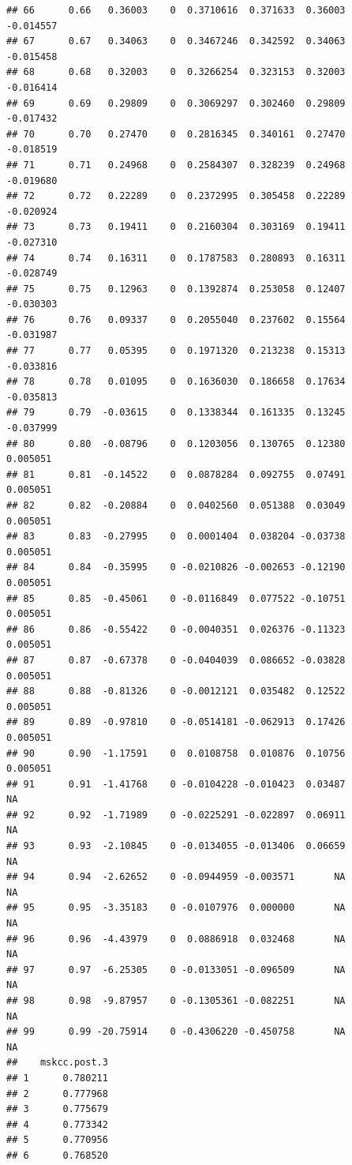 \documentclass{article}\usepackage[]{graphicx}\usepackage[]{color}
\makeatletter
\newenvironment{kframe}{%
 \def\at@end@of@kframe{}%
 \ifinner\ifhmode%
  \def\at@end@of@kframe{\end{minipage}}%
  \begin{minipage}{\columnwidth}%
 \fi\fi%
 \def\FrameCommand##1{\hskip\@totalleftmargin \hskip-\fboxsep
 \colorbox{shadecolor}{##1}\hskip-\fboxsep
     \hskip-\linewidth \hskip-\@totalleftmargin \hskip\columnwidth}%
 \MakeFramed {\advance\hsize-\width
   \@totalleftmargin\z@ \linewidth\hsize
   \@setminipage}}%
 {\par\unskip\endMakeFramed%
 \at@end@of@kframe}
\newenvironment{knitrout}{}{} %
\makeatother
\begin{document}
\begin{knitrout}
\begin{kframe}
\begin{verbatim}
## 66      0.66   0.36003    0  0.3710616  0.371633  0.36003   -0.014557
## 67      0.67   0.34063    0  0.3467246  0.342592  0.34063   -0.015458
## 68      0.68   0.32003    0  0.3266254  0.323153  0.32003   -0.016414
## 69      0.69   0.29809    0  0.3069297  0.302460  0.29809   -0.017432
## 70      0.70   0.27470    0  0.2816345  0.340161  0.27470   -0.018519
## 71      0.71   0.24968    0  0.2584307  0.328239  0.24968   -0.019680
## 72      0.72   0.22289    0  0.2372995  0.305458  0.22289   -0.020924
## 73      0.73   0.19411    0  0.2160304  0.303169  0.19411   -0.027310
## 74      0.74   0.16311    0  0.1787583  0.280893  0.16311   -0.028749
## 75      0.75   0.12963    0  0.1392874  0.253058  0.12407   -0.030303
## 76      0.76   0.09337    0  0.2055040  0.237602  0.15564   -0.031987
## 77      0.77   0.05395    0  0.1971320  0.213238  0.15313   -0.033816
## 78      0.78   0.01095    0  0.1636030  0.186658  0.17634   -0.035813
## 79      0.79  -0.03615    0  0.1338344  0.161335  0.13245   -0.037999
## 80      0.80  -0.08796    0  0.1203056  0.130765  0.12380    0.005051
## 81      0.81  -0.14522    0  0.0878284  0.092755  0.07491    0.005051
## 82      0.82  -0.20884    0  0.0402560  0.051388  0.03049    0.005051
## 83      0.83  -0.27995    0  0.0001404  0.038204 -0.03738    0.005051
## 84      0.84  -0.35995    0 -0.0210826 -0.002653 -0.12190    0.005051
## 85      0.85  -0.45061    0 -0.0116849  0.077522 -0.10751    0.005051
## 86      0.86  -0.55422    0 -0.0040351  0.026376 -0.11323    0.005051
## 87      0.87  -0.67378    0 -0.0404039  0.086652 -0.03828    0.005051
## 88      0.88  -0.81326    0 -0.0012121  0.035482  0.12522    0.005051
## 89      0.89  -0.97810    0 -0.0514181 -0.062913  0.17426    0.005051
## 90      0.90  -1.17591    0  0.0108758  0.010876  0.10756    0.005051
## 91      0.91  -1.41768    0 -0.0104228 -0.010423  0.03487          NA
## 92      0.92  -1.71989    0 -0.0225291 -0.022897  0.06911          NA
## 93      0.93  -2.10845    0 -0.0134055 -0.013406  0.06659          NA
## 94      0.94  -2.62652    0 -0.0944959 -0.003571       NA          NA
## 95      0.95  -3.35183    0 -0.0107976  0.000000       NA          NA
## 96      0.96  -4.43979    0  0.0886918  0.032468       NA          NA
## 97      0.97  -6.25305    0 -0.0133051 -0.096509       NA          NA
## 98      0.98  -9.87957    0 -0.1305361 -0.082251       NA          NA
## 99      0.99 -20.75914    0 -0.4306220 -0.450758       NA          NA
##    mskcc.post.3
## 1      0.780211
## 2      0.777968
## 3      0.775679
## 4      0.773342
## 5      0.770956
## 6      0.768520

\end{verbatim}
\end{kframe}
\end{knitrout}
\end{document}
